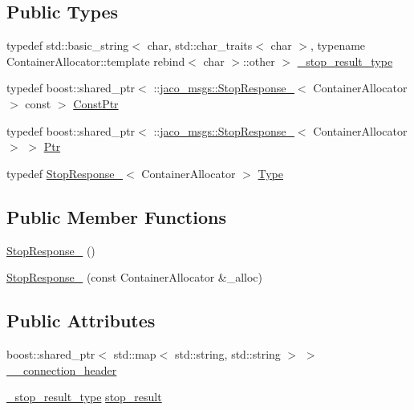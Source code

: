 \subsection*{Public Types}
\begin{DoxyCompactItemize}
\item 
typedef std\+::basic\+\_\+string$<$ char, std\+::char\+\_\+traits$<$ char $>$, typename Container\+Allocator\+::template rebind$<$ char $>$\+::other $>$ \hyperlink{structjaco__msgs_1_1StopResponse___a26c3d39d10b87a3ce89bd27f50d7b788}{\+\_\+stop\+\_\+result\+\_\+type}
\item 
typedef boost\+::shared\+\_\+ptr$<$ \+::\hyperlink{structjaco__msgs_1_1StopResponse__}{jaco\+\_\+msgs\+::\+Stop\+Response\+\_\+}$<$ Container\+Allocator $>$ const  $>$ \hyperlink{structjaco__msgs_1_1StopResponse___ac6329c392d36e795a755bc9c2fdae72e}{Const\+Ptr}
\item 
typedef boost\+::shared\+\_\+ptr$<$ \+::\hyperlink{structjaco__msgs_1_1StopResponse__}{jaco\+\_\+msgs\+::\+Stop\+Response\+\_\+}$<$ Container\+Allocator $>$ $>$ \hyperlink{structjaco__msgs_1_1StopResponse___a72009453942d0f347cf6e03df1d065eb}{Ptr}
\item 
typedef \hyperlink{structjaco__msgs_1_1StopResponse__}{Stop\+Response\+\_\+}$<$ Container\+Allocator $>$ \hyperlink{structjaco__msgs_1_1StopResponse___aacce47cb15c303b83b12f5a4104389e8}{Type}
\end{DoxyCompactItemize}
\subsection*{Public Member Functions}
\begin{DoxyCompactItemize}
\item 
\hyperlink{structjaco__msgs_1_1StopResponse___af29f8b13387ba40a1067438ad322d381}{Stop\+Response\+\_\+} ()
\item 
\hyperlink{structjaco__msgs_1_1StopResponse___a8202717ce1e3645d82b4cb5f9bafb28e}{Stop\+Response\+\_\+} (const Container\+Allocator \&\+\_\+alloc)
\end{DoxyCompactItemize}
\subsection*{Public Attributes}
\begin{DoxyCompactItemize}
\item 
boost\+::shared\+\_\+ptr$<$ std\+::map$<$ std\+::string, std\+::string $>$ $>$ \hyperlink{structjaco__msgs_1_1StopResponse___a2bf1076d97ebefc69613a0927069ee28}{\+\_\+\+\_\+connection\+\_\+header}
\item 
\hyperlink{structjaco__msgs_1_1StopResponse___a26c3d39d10b87a3ce89bd27f50d7b788}{\+\_\+stop\+\_\+result\+\_\+type} \hyperlink{structjaco__msgs_1_1StopResponse___a9dc418ecf2ecbae176732d3fdf6e7b66}{stop\+\_\+result}
\end{DoxyCompactItemize}


